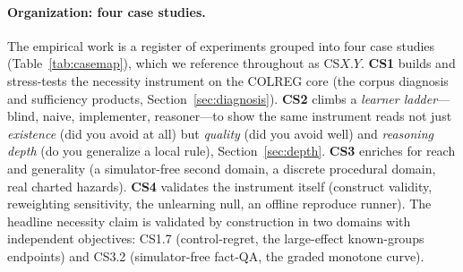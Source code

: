 \documentclass{article}
\begin{document}
\paragraph{Organization: four case studies.} The empirical work is a register of experiments grouped
into four case studies (Table~\ref{tab:casemap}), which we reference throughout as CS$X.Y$.
\textbf{CS1} builds and stress-tests the necessity instrument on the COLREG core (the corpus
diagnosis and sufficiency products, Section~\ref{sec:diagnosis}). \textbf{CS2} climbs a
\emph{learner ladder}---blind, naive, implementer, reasoner---to show the same instrument reads not
just \emph{existence} (did you avoid at all) but \emph{quality} (did you avoid well) and
\emph{reasoning depth} (do you generalize a local rule), Section~\ref{sec:depth}. \textbf{CS3}
enriches for reach and generality (a simulator-free second domain, a discrete procedural domain, real
charted hazards). \textbf{CS4} validates the instrument itself (construct validity, reweighting
sensitivity, the unlearning null, an offline reproduce runner). The headline necessity claim is
validated by construction in two domains with independent objectives: CS1.7 (control-regret, the
large-effect known-groups endpoints) and CS3.2 (simulator-free fact-QA, the graded monotone curve).
\end{document}
